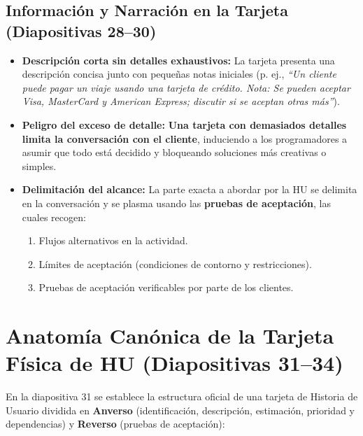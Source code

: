 \subsection{Información y Narración en la Tarjeta (Diapositivas 28--30)}
\begin{itemize}[itemsep=3pt]
    \item \textbf{Descripción corta sin detalles exhaustivos:} La tarjeta presenta una descripción concisa junto con pequeñas notas iniciales (p. ej., \textit{``Un cliente puede pagar un viaje usando una tarjeta de crédito. Nota: Se pueden aceptar Visa, MasterCard y American Express; discutir si se aceptan otras más''}).
    \item \textbf{Peligro del exceso de detalle:} \textbf{Una tarjeta con demasiados detalles limita la conversación con el cliente}, induciendo a los programadores a asumir que todo está decidido y bloqueando soluciones más creativas o simples.
    \item \textbf{Delimitación del alcance:} La parte exacta a abordar por la HU se delimita en la conversación y se plasma usando las \textbf{pruebas de aceptación}, las cuales recogen:
    \begin{enumerate}
        \item Flujos alternativos en la actividad.
        \item Límites de aceptación (condiciones de contorno y restricciones).
        \item Pruebas de aceptación verificables por parte de los clientes.
    \end{enumerate}
\end{itemize}

\section{Anatomía Canónica de la Tarjeta Física de HU (Diapositivas 31--34)}

En la diapositiva 31 se establece la estructura oficial de una tarjeta de Historia de Usuario dividida en \textbf{Anverso} (identificación, descripción, estimación, prioridad y dependencias) y \textbf{Reverso} (pruebas de aceptación):

